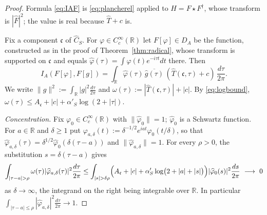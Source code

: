 \documentclass[11pt]{amsart}
\theoremstyle{definition}
\theoremstyle{remark}
\newcommand{\R}{\mathbb R}
\newcommand{\Th}{\widehat{T}}
\newcommand{\Ch}{\widehat{C}_S}
\newcommand{\DA}{D_A}
\begin{document}
\begin{proof}
Formula \eqref{eq:IAF} is \eqref{eq:plancherel} applied to $H=F\star
F^{\dagger}$, whose transform is $|\widehat F|^{2}$; the value is real because
$\Th+c$ is.

Fix a component $\mathfrak c$ of $\Ch$.  For $\varphi\in C_c^{\infty}(\R)$ let
$F[\varphi]\in\DA$ be the function, constructed as in the proof of
Theorem~\ref{thm:radical}, whose transform is supported on $\mathfrak c$ and
equals $\widehat\varphi(\tau)=\int\varphi(t)e^{-i\tau t}dt$ there.  Then
\[
I_A(F[\varphi],F[g])=\int_{\R}\widehat\varphi(\tau)\,
\overline{\widehat g(\tau)}\,(\Th(\mathfrak c,\tau)+c)\,\frac{d\tau}{2\pi}.
\]
We write $\lVert g\rVert^{2}:=\int_{\R}|g|^{2}\frac{d\tau}{2\pi}$ and
$\omega(\tau):=|\Th(\mathfrak c,\tau)|+|c|$.  By \eqref{eq:logbound},
$\omega(\tau)\le A_{\mathfrak c}+|c|+\alpha'_S\log(2+|\tau|)$.

\emph{Concentration.}  Fix $\varphi_0\in C_c^{\infty}(\R)$ with
$\lVert\widehat\varphi_0\rVert=1$; $\widehat\varphi_0$ is a Schwartz function.
For $a\in\R$ and $\delta\ge1$ put
$\varphi_{a,\delta}(t):=\delta^{-1/2}e^{iat}\varphi_0(t/\delta)$, so that
$\widehat\varphi_{a,\delta}(\tau)=\delta^{1/2}\widehat\varphi_0(\delta(\tau-a))$
and $\lVert\widehat\varphi_{a,\delta}\rVert=1$.  For every $\rho>0$, the
substitution $s=\delta(\tau-a)$ gives
\begin{equation}\label{eq:weightedtail}
\int_{|\tau-a|>\rho}\omega(\tau)
|\widehat\varphi_{a,\delta}(\tau)|^{2}\frac{d\tau}{2\pi}
\le\int_{|s|>\delta\rho}\Bigl(A_{\mathfrak c}+|c|+\alpha'_S\log\bigl(2+|a|+|s|\bigr)\Bigr)
|\widehat\varphi_0(s)|^{2}\frac{ds}{2\pi}\ \longrightarrow\ 0
\end{equation}
as $\delta\to\infty$, the integrand on the right being integrable over $\R$.
In particular $\int_{|\tau-a|\le\rho}|\widehat\varphi_{a,\delta}|^{2}
\frac{d\tau}{2\pi}\to1$.


\end{proof}
\end{document}
